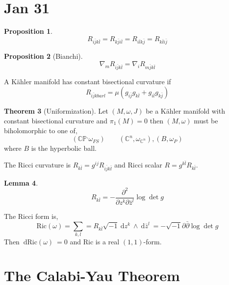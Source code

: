 \documentclass[12pt]{extarticle}
\newcommand{\C}{\mathbb{C}}
\renewcommand{\d}[1]{\: \mathrm{d}#1 \:}
\theoremstyle{definition}
\newtheorem{theorem}{Theorem}[section]
\newtheorem{lemma}[theorem]{Lemma}
\newtheorem{proposition}[theorem]{Proposition}
\newenvironment{definition}[1][Definition:]{\begin{trivlist}
\item[\hskip \labelsep {\bfseries #1}]}{\end{trivlist}}
\newcommand{\CP}{\mathbb{CP}}
\begin{document}
\section{Jan 31}

\begin{proposition}
\[ R_{i \bar{j} k \bar{l}} = R_{k \bar{j} i \bar{l}} = R_{i \bar{l} k \bar{j}} = R_{k \bar{l} i \bar{j}} \]
\end{proposition}

\begin{proposition}[Bianchi]
\[ \nabla_m R_{i \bar{j} k \bar{l}} = \nabla_i R_{m \bar{j} k \bar{l}} \]
\end{proposition}

\begin{definition}
A K\"{a}hler manifold has constant bisectional curvature if 
\[ R_{i \bar{j} k bar{l}} = \mu \left( g_{i\bar{j}} g_{k \bar{l}} + g_{i \bar{l}} g_{k \bar{j}} \right) \]
\end{definition}

\begin{theorem}[Uniformization]
Let $(M, \omega, J)$ be a K\"{a}hler manifold with constant bisectional curvature and $\pi_1(M) = 0$ then $(M, \omega)$ must be biholomorphic to one of,
\[ (\CP^, \omega_{FS}) \quad \quad (\C^n, \omega_{\C^n}), (B, \omega_P) \]
where $B$ is the hyperbolic ball.
\end{theorem}

\begin{definition}
The Ricci curvature is $R_{k \bar{l}} = g^{ij} R_{i \bar{j} k \bar{l}}$ and Ricci scalar $R = g^{k \bar{l}} R_{k \bar{l}}$.
\end{definition}

\begin{lemma}
\[ R_{k \bar{l}} = - \frac{\partial^2}{\partial z^k \partial \bar{z}^l} \log{\det{g}} \]
\end{lemma}

\newcommand{\Ric}{\mathrm{Ric}}

\begin{definition}
The Ricci form is,
\[ \Ric(\omega) = \sum_{k,l} = R_{k \bar{l}} \sqrt{-1} \d{z^k} \wedge \d{\bar{z}^l} = - \sqrt{-1} \partial \bar{\partial} \log{\det{g}} \] 
Then $\d{\Ric(\omega)} = 0$ and $\Ric$ is a real $(1, 1)$-form.
\end{definition}

\section{The Calabi-Yau Theorem}
\end{document}
